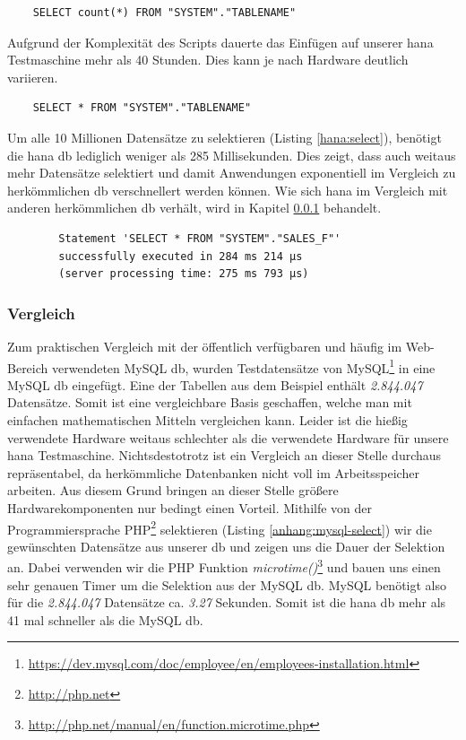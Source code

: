 \begin{lstlisting}
	SELECT count(*) FROM "SYSTEM"."TABLENAME"
\end{lstlisting}

Aufgrund der Komplexität des Scripts dauerte das Einfügen auf unserer \gls{hana} Testmaschine mehr als 40 Stunden. Dies kann je nach Hardware deutlich variieren.\\

\begin{lstlisting}
	SELECT * FROM "SYSTEM"."TABLENAME"
\end{lstlisting}

Um alle 10 Millionen Datensätze zu selektieren (Listing \ref{hana:select}), benötigt die \gls{hana} \gls{db} lediglich weniger als 285 Millisekunden. Dies zeigt, dass auch weitaus mehr Datensätze selektiert und damit Anwendungen exponentiell im Vergleich zu herkömmlichen \gls{db} verschnellert werden können. Wie sich \gls{hana} im Vergleich mit anderen herkömmlichen \gls{db} verhält, wird in Kapitel \ref{sec:db-hana-vgl} behandelt.

\begin{center}
	\begin{verbatim}
		Statement 'SELECT * FROM "SYSTEM"."SALES_F"' 
		successfully executed in 284 ms 214 µs  
		(server processing time: 275 ms 793 µs)
	\end{verbatim}
\end{center}

\subsubsection{Vergleich}
\label{sec:db-hana-vgl}
Zum praktischen Vergleich mit der öffentlich verfügbaren und häufig im Web-Bereich verwendeten MySQL \gls{db}, wurden Testdatensätze von MySQL\footnote{\url{https://dev.mysql.com/doc/employee/en/employees-installation.html}} in eine MySQL \gls{db} eingefügt. Eine der Tabellen aus dem Beispiel enthält \emph{2.844.047} Datensätze. Somit ist eine vergleichbare Basis geschaffen, welche man mit einfachen mathematischen Mitteln vergleichen kann. Leider ist die hießig verwendete Hardware weitaus schlechter als die verwendete Hardware für unsere \gls{hana} Testmaschine. Nichtsdestotrotz ist ein Vergleich an dieser Stelle durchaus repräsentabel, da herkömmliche Datenbanken nicht voll im Arbeitsspeicher arbeiten. Aus diesem Grund bringen an dieser Stelle größere Hardwarekomponenten nur bedingt einen Vorteil.
Mithilfe von der Programmiersprache PHP\footnote{\url{http://php.net}} selektieren (Listing \ref{anhang:mysql-select}) wir die gewünschten Datensätze aus unserer \gls{db} und zeigen uns die Dauer der Selektion an. Dabei verwenden wir die PHP Funktion \emph{microtime()}\footnote{\url{http://php.net/manual/en/function.microtime.php}} und bauen uns einen sehr genauen Timer um die Selektion aus der MySQL \gls{db}.
MySQL benötigt also für die \emph{2.844.047} Datensätze ca. \emph{3.27} Sekunden. Somit ist die \gls{hana} \gls{db} mehr als 41 mal schneller als die MySQL \gls{db}. 

